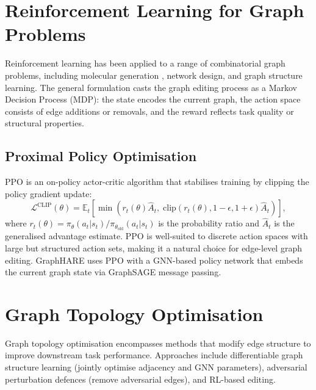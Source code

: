 \section{Reinforcement Learning for Graph Problems}

Reinforcement learning has been applied to a range of combinatorial graph problems,
including molecular generation \cite{you2018gcpn}, network design, and graph structure
learning. The general formulation casts the graph editing process as a Markov Decision
Process (MDP): the state encodes the current graph, the action space consists of edge
additions or removals, and the reward reflects task quality or structural properties.

\subsection{Proximal Policy Optimisation}

PPO \cite{schulman2017ppo} is an on-policy actor-critic algorithm that stabilises training
by clipping the policy gradient update:
\begin{equation}
    \mathcal{L}^{\text{CLIP}}(\theta) = \mathbb{E}_t \left[
    \min\!\left(r_t(\theta)\hat{A}_t,\;
    \text{clip}(r_t(\theta), 1-\epsilon, 1+\epsilon)\hat{A}_t\right)\right],
\end{equation}
where $r_t(\theta) = \pi_\theta(a_t|s_t)/\pi_{\theta_\text{old}}(a_t|s_t)$ is the
probability ratio and $\hat{A}_t$ is the generalised advantage estimate. PPO is well-suited
to discrete action spaces with large but structured action sets, making it a natural
choice for edge-level graph editing. GraphHARE uses PPO with a GNN-based policy network
that embeds the current graph state via GraphSAGE message passing.

\section{Graph Topology Optimisation}

Graph topology optimisation encompasses methods that modify edge structure to improve
downstream task performance. Approaches include differentiable graph structure learning
(jointly optimise adjacency and GNN parameters), adversarial perturbation defences
(remove adversarial edges), and RL-based editing.

